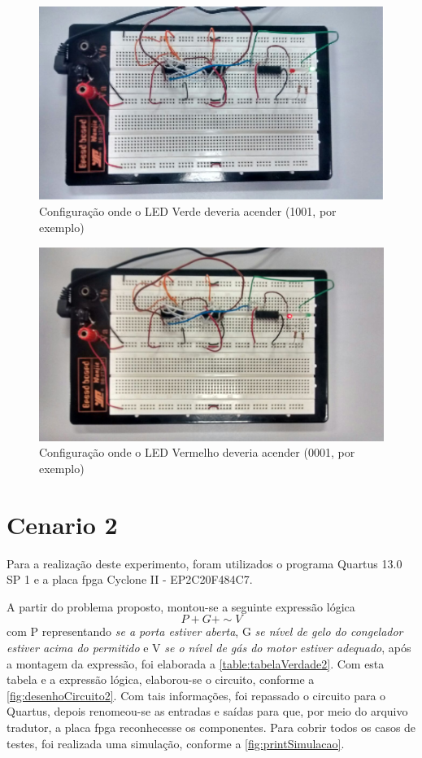 	\begin{figure}[H]
		\centering
		\caption{\label{fig:protoboard1}Configuração onde o LED Verde deveria acender (1001, por exemplo)}
		\includegraphics[width=1\textwidth]{img/cenario1/protoboard1}
	\end{figure}

	\begin{figure}[H]
		\centering
		\caption{\label{fig:protoboard2}Configuração onde o LED Vermelho deveria acender (0001, por exemplo)}
		\includegraphics[width=1\textwidth]{img/cenario1/protoboard2}
	\end{figure}

\section{Cenario 2}
	Para a realização deste experimento, foram utilizados o programa Quartus 13.0 SP 1 e a placa \ac{fpga}
	Cyclone II - EP2C20F484C7.

	A partir do problema proposto, montou-se a seguinte expressão lógica
	$$ P + G + \sim V$$
	com P representando \textit{se a porta estiver aberta}, G
	\textit{se nível de gelo do congelador estiver acima do permitido} e V
	\textit{se o nível de gás do motor estiver adequado}, após a
	montagem da expressão, foi elaborada a \autoref{table:tabelaVerdade2}. Com esta tabela e a expressão lógica,
	elaborou-se o circuito, conforme a \autoref{fig:desenhoCircuito2}. Com tais informações, foi repassado o circuito
	para o Quartus, depois renomeou-se as entradas e saídas para que, por meio do arquivo tradutor, a placa
	\ac{fpga} reconhecesse os componentes.
	Para cobrir todos os casos de testes, foi realizada uma simulação, conforme a \autoref{fig:printSimulacao}.

